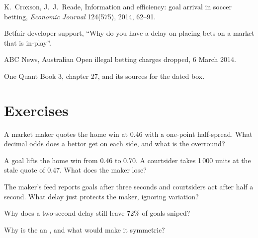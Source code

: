 \begin{omsources}
\item K.~Croxson, J.~J.~Reade, Information and efficiency: goal arrival in soccer betting, \emph{Economic Journal} 124(575), 2014, 62--91.
\item Betfair developer support, ``Why do you have a delay on placing bets on a market that is in-play''.
\item ABC News, Australian Open illegal betting charges dropped, 6 March 2014.
\item One Quant Book 3, chapter 27, and its sources for the dated box.
\end{omsources}

\section{Exercises}

\begin{exercise}[$\star$]\label{exo:hf:prediction-and-sports-market-making:1}
A market maker quotes the home win at 0.46 with a one-point half-spread. What decimal odds does a bettor get on each side, and what is the overround?
\end{exercise}

\begin{exercise}[$\star$]\label{exo:hf:prediction-and-sports-market-making:2}
A goal lifts the home win from 0.46 to 0.70. A courtsider takes 1\,000 units at the stale quote of 0.47. What does the maker lose?
\end{exercise}

\begin{exercise}[$\star$]\label{exo:hf:prediction-and-sports-market-making:3}
The maker's feed reports goals after three seconds and courtsiders act after half a second. What delay just protects the maker, ignoring
variation?
\end{exercise}

\begin{exercise}[$\star\star$]\label{exo:hf:prediction-and-sports-market-making:4}
Why does a two-second delay still leave 72\% of goals sniped?
\end{exercise}

\begin{exercise}[$\star\star$]\label{exo:hf:prediction-and-sports-market-making:5}
Why is the  an , and what would make it symmetric?
\end{exercise}

